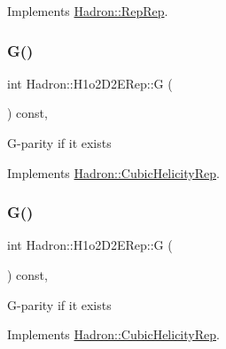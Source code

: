 Implements \mbox{\hyperlink{structHadron_1_1RepRep_a92c8802e5ed7afd7da43ccfd5b7cd92b}{Hadron\+::\+Rep\+Rep}}.

\mbox{\label{structHadron_1_1H1o2D2ERep_a09f0fcd2252874b4875f2931d43349b6}} 
\subsubsection{\texorpdfstring{G()}{G()}\hspace{0.1cm}{\footnotesize\ttfamily [1/3]}}
{\footnotesize\ttfamily int Hadron\+::\+H1o2\+D2\+E\+Rep\+::G (\begin{DoxyParamCaption}{ }\end{DoxyParamCaption}) const\hspace{0.3cm}{\ttfamily [inline]}, {\ttfamily [virtual]}}

G-\/parity if it exists 

Implements \mbox{\hyperlink{structHadron_1_1CubicHelicityRep_a50689f42be1e6170aa8cf6ad0597018b}{Hadron\+::\+Cubic\+Helicity\+Rep}}.

\mbox{\label{structHadron_1_1H1o2D2ERep_a09f0fcd2252874b4875f2931d43349b6}} 
\subsubsection{\texorpdfstring{G()}{G()}\hspace{0.1cm}{\footnotesize\ttfamily [2/3]}}
{\footnotesize\ttfamily int Hadron\+::\+H1o2\+D2\+E\+Rep\+::G (\begin{DoxyParamCaption}{ }\end{DoxyParamCaption}) const\hspace{0.3cm}{\ttfamily [inline]}, {\ttfamily [virtual]}}

G-\/parity if it exists 

Implements \mbox{\hyperlink{structHadron_1_1CubicHelicityRep_a50689f42be1e6170aa8cf6ad0597018b}{Hadron\+::\+Cubic\+Helicity\+Rep}}.

\mbox{\label{structHadron_1_1H1o2D2ERep_a09f0fcd2252874b4875f2931d43349b6}} 
